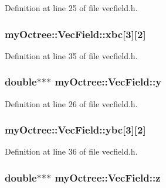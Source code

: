 Definition at line 25 of file vecfield.\+h.

\hypertarget{classmy_octree_1_1_vec_field_a89bb31aefadf48f4c2530ec11f3d95ab}{}
\subsubsection[{xbc}]{ my\+Octree\+::\+Vec\+Field\+::xbc\mbox{[}3\mbox{]}\mbox{[}2\mbox{]}}\label{classmy_octree_1_1_vec_field_a89bb31aefadf48f4c2530ec11f3d95ab}


Definition at line 35 of file vecfield.\+h.

\hypertarget{classmy_octree_1_1_vec_field_ace7d75993bdfee30c7ced97ada5de324}{}
\subsubsection[{y}]{\setlength{\rightskip}{0pt plus 5cm}double$\ast$$\ast$$\ast$ my\+Octree\+::\+Vec\+Field\+::y}\label{classmy_octree_1_1_vec_field_ace7d75993bdfee30c7ced97ada5de324}


Definition at line 26 of file vecfield.\+h.

\hypertarget{classmy_octree_1_1_vec_field_a423ac64f945635fc8e1a328f8d93a297}{}
\subsubsection[{ybc}]{ my\+Octree\+::\+Vec\+Field\+::ybc\mbox{[}3\mbox{]}\mbox{[}2\mbox{]}}\label{classmy_octree_1_1_vec_field_a423ac64f945635fc8e1a328f8d93a297}


Definition at line 36 of file vecfield.\+h.

\hypertarget{classmy_octree_1_1_vec_field_aee1c8c4d393246a34793a5cde59071b8}{}
\subsubsection[{z}]{\setlength{\rightskip}{0pt plus 5cm}double$\ast$$\ast$$\ast$ my\+Octree\+::\+Vec\+Field\+::z}\label{classmy_octree_1_1_vec_field_aee1c8c4d393246a34793a5cde59071b8}


